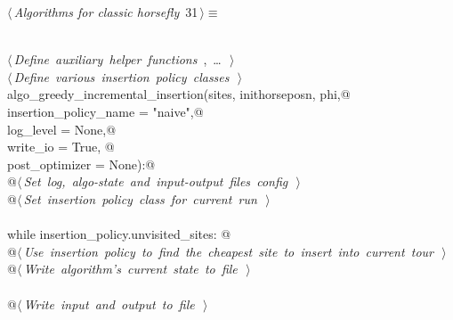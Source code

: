 \documentclass[11.5pt]{report}
\begin{document}
\begin{flushleft} \small\label{scrap22}\raggedright\small
{} $\langle\,${\itshape Algorithms for classic horsefly}\nobreak\ {\footnotesize {31}}$\,\rangle\equiv$
\vspace{-1ex}
\begin{list}{}{} \item
\mbox{}\verb@@\\
\mbox{}\verb@@\hbox{$\langle\,${\itshape Define auxiliary helper functions}\nobreak\ {\footnotesize {}, \ldots\ }$\,\rangle$}\verb@@\\
\mbox{}\verb@@\hbox{$\langle\,${\itshape Define various insertion policy classes}\nobreak\ {\footnotesize {}}$\,\rangle$}\verb@@\\
\mbox{}\verb@def algo_greedy_incremental_insertion(sites, inithorseposn, phi,@\\
\mbox{}\verb@                                      insertion_policy_name = "naive",@\\
\mbox{}\verb@                                      log_level             = None,@\\
\mbox{}\verb@                                      write_io              = True, @\\
\mbox{}\verb@                                      post_optimizer        = None):@\\
\mbox{}\verb@      @\hbox{$\langle\,${\itshape Set log, algo-state and input-output files config}\nobreak\ {\footnotesize {}}$\,\rangle$}\verb@@\\
\mbox{}\verb@      @\hbox{$\langle\,${\itshape Set insertion policy class for current run}\nobreak\ {\footnotesize {}}$\,\rangle$}\verb@@\\
\mbox{}\verb@@\\
\mbox{}\verb@      while insertion_policy.unvisited_sites: @\\
\mbox{}\verb@         @\hbox{$\langle\,${\itshape Use insertion policy to find the cheapest site to insert into current tour}\nobreak\ {\footnotesize {}}$\,\rangle$}\verb@@\\
\mbox{}\verb@         @\hbox{$\langle\,${\itshape Write algorithm's current state to file}\nobreak\ {\footnotesize {}}$\,\rangle$}\verb@@\\
\mbox{}\verb@@\\
\mbox{}\verb@      @\hbox{$\langle\,${\itshape Write input and output to file}\nobreak\ {\footnotesize {}}$\,\rangle$}\verb@@\\

\end{list}
\end{flushleft}
\end{document}
